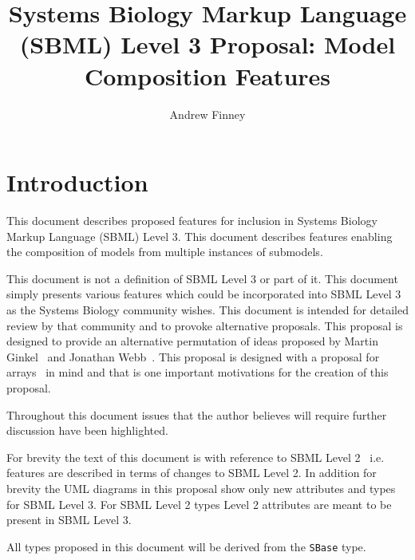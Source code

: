 \documentclass{cekarticle}
\begin{document}

\title{Systems Biology Markup Language (SBML) Level 3 Proposal: Model Composition Features}

\author{Andrew Finney}


\maketitlepage

\section{Introduction}
\label{sec:introduction}

This document describes proposed features for inclusion in
Systems Biology Markup Language (SBML) Level 3. This document
describes features enabling the composition of models from multiple instances of submodels.  

This document is not a definition of SBML Level 3 or part of it.
This document simply presents various features which could be
incorporated into SBML Level 3 as the Systems Biology community
wishes.  This document is intended for detailed review by that
community and to provoke alternative proposals.  
This proposal is designed to provide an alternative permutation of ideas
proposed by Martin Ginkel~\citep{ginkel:2002} and Jonathan Webb~\citep{webb:2003}.
This proposal is designed with a proposal for arrays~\citep{finney:2003} in mind
and that is one important motivations for the creation of this proposal.

Throughout this
document issues that the author believes will require further
discussion have been highlighted.

For brevity the text of this document is with reference to SBML
Level 2~\citep{finney:2002f} i.e. features are described in terms
of changes to SBML Level 2.  In addition for brevity the UML diagrams in this proposal
show only new attributes and types for SBML Level 3.  For SBML Level 2 types Level 2
attributes are meant to be present in SBML Level 3.

All types proposed in this document will be derived from the
\texttt{SBase} type.
\end{document}
